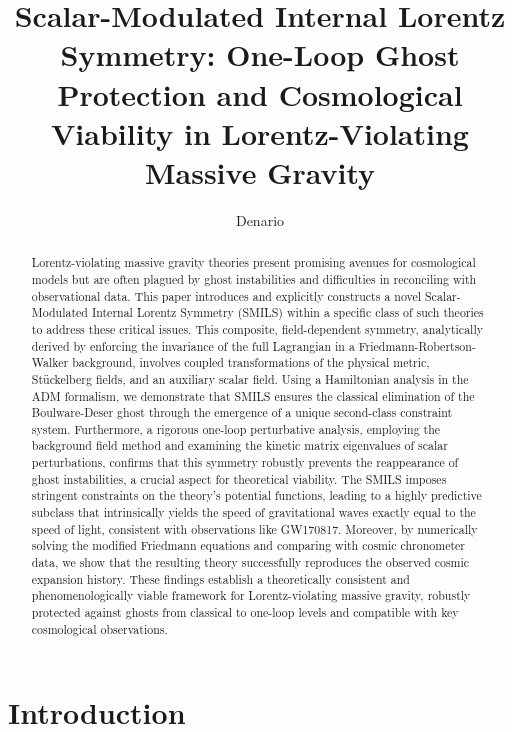 \documentclass[twocolumn]{aastex631}
\begin{document}
\title{Scalar-Modulated Internal Lorentz Symmetry: One-Loop Ghost Protection and Cosmological Viability in Lorentz-Violating Massive Gravity}

\author{Denario}

\begin{abstract}
Lorentz-violating massive gravity theories present promising avenues for cosmological models but are often plagued by ghost instabilities and difficulties in reconciling with observational data. This paper introduces and explicitly constructs a novel Scalar-Modulated Internal Lorentz Symmetry (SMILS) within a specific class of such theories to address these critical issues. This composite, field-dependent symmetry, analytically derived by enforcing the invariance of the full Lagrangian in a Friedmann-Robertson-Walker background, involves coupled transformations of the physical metric, Stückelberg fields, and an auxiliary scalar field. Using a Hamiltonian analysis in the ADM formalism, we demonstrate that SMILS ensures the classical elimination of the Boulware-Deser ghost through the emergence of a unique second-class constraint system. Furthermore, a rigorous one-loop perturbative analysis, employing the background field method and examining the kinetic matrix eigenvalues of scalar perturbations, confirms that this symmetry robustly prevents the reappearance of ghost instabilities, a crucial aspect for theoretical viability. The SMILS imposes stringent constraints on the theory's potential functions, leading to a highly predictive subclass that intrinsically yields the speed of gravitational waves exactly equal to the speed of light, consistent with observations like GW170817. Moreover, by numerically solving the modified Friedmann equations and comparing with cosmic chronometer data, we show that the resulting theory successfully reproduces the observed cosmic expansion history. These findings establish a theoretically consistent and phenomenologically viable framework for Lorentz-violating massive gravity, robustly protected against ghosts from classical to one-loop levels and compatible with key cosmological observations.
\end{abstract}



\section{Introduction}
\label{sec:intro}
\end{document}
